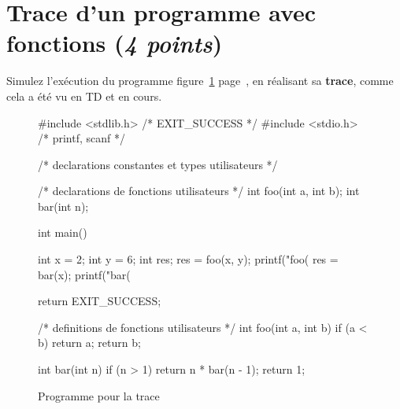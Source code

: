 



\section{Trace d'un programme avec fonctions (\emph{4 points})}

\question Simulez l'exécution du programme figure~\ref{fig:prog} page~\pageref{fig:prog}, en réalisant sa
\textbf{trace}, comme cela a été vu en TD et en cours. 

\begin{figure}[htb]
  \centering
\begin{small}
\begin{listing}{1}
#include <stdlib.h> /* EXIT_SUCCESS */
#include <stdio.h> /* printf, scanf */

/* declarations constantes et types utilisateurs */

/* declarations de fonctions utilisateurs */
int foo(int a, int b);
int bar(int n);

int main()
{
    int x = 2;
    int y = 6;
    int res;
    res = foo(x, y);
    printf("foo(%
    res = bar(x);
    printf("bar(%
    
    return EXIT_SUCCESS;
}

/* definitions de fonctions utilisateurs */
int foo(int a, int b)
{
    if (a < b)
    {
        return a;
    }
    return b;
}

int bar(int n)
{
   if (n > 1) 
   {
       return n * bar(n - 1);
   }
   return 1;
}
\end{listing}
\end{small} 
  \caption{Programme pour la trace}
  \label{fig:prog}
\end{figure}

